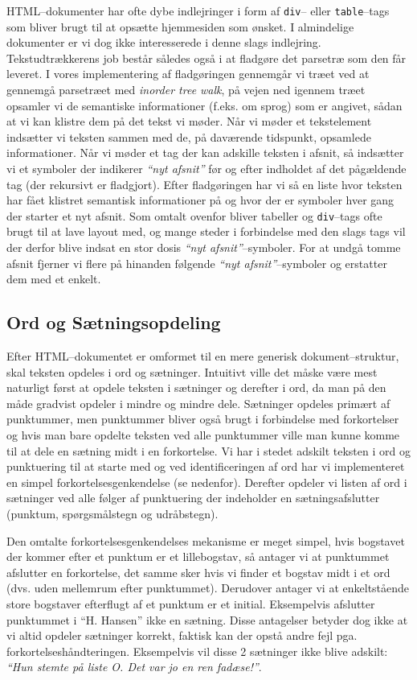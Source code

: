 \documentclass[a4paper,oneside]{memoir}
\begin{document}
HTML--dokumenter har ofte dybe indlejringer i form af \texttt{div}--
eller \texttt{table}--tags som bliver brugt til at opsætte hjemmesiden
som ønsket. I almindelige dokumenter er vi dog ikke interesserede i
denne slags indlejring. Tekstudtrækkerens job består således også i at
fladgøre det parsetræ som den får leveret. I vores implementering af
fladgøringen gennemgår vi træet ved at gennemgå parsetræet med
\textit{inorder tree walk}, på vejen ned igennem træet opsamler vi de
semantiske informationer (f.eks. om sprog) som er angivet, sådan at vi
kan klistre dem på det tekst vi møder. Når vi møder et tekstelement
indsætter vi teksten sammen med de, på daværende tidspunkt, opsamlede
informationer. Når vi møder et tag der kan adskille teksten i afsnit,
så indsætter vi et symboler der indikerer \textit{``nyt afsnit''} før
og efter indholdet af det pågældende tag (der rekursivt er
fladgjort). Efter fladgøringen har vi så en liste hvor teksten har
fået klistret semantisk informationer på og hvor der er symboler hver
gang der starter et nyt afsnit. Som omtalt ovenfor bliver tabeller og
\texttt{div}--tags ofte brugt til at lave layout med, og mange steder
i forbindelse med den slags tags vil der derfor blive indsat en stor
dosis \textit{``nyt afsnit''}--symboler. For at undgå tomme afsnit
fjerner vi flere på hinanden følgende \textit{``nyt
  afsnit''}--symboler og erstatter dem med et enkelt.

\subsection{Ord og Sætningsopdeling}
Efter HTML--dokumentet er omformet til en mere generisk
dokument--struktur, skal teksten opdeles i ord og sætninger. Intuitivt
ville det måske være mest naturligt først at opdele teksten i
sætninger og derefter i ord, da man på den måde gradvist opdeler i
mindre og mindre dele. Sætninger opdeles primært af punktummer, men
punktummer bliver også brugt i forbindelse med forkortelser og hvis
man bare opdelte teksten ved alle punktummer ville man kunne komme til
at dele en sætning midt i en forkortelse. Vi har i stedet adskilt
teksten i ord og punktuering til at starte med og ved identificeringen
af ord har vi implementeret en simpel
forkortelsesgenkendelse (se nedenfor). Derefter opdeler vi listen af ord i
sætninger ved alle følger af punktuering der indeholder en
sætningsafslutter (punktum, spørgsmålstegn og udråbstegn).

Den omtalte forkortelsesgenkendelses mekanisme er meget simpel, hvis
bogstavet der kommer efter et punktum er et lillebogstav, så antager
vi at punktummet afslutter en forkortelse, det samme sker hvis vi
finder et bogstav midt i et ord (dvs. uden mellemrum efter
punktummet). Derudover antager vi at enkeltstående store bogstaver
efterflugt af et punktum er et initial. Eksempelvis afslutter
punktummet i ``H. Hansen'' ikke en sætning. Disse antagelser betyder
dog ikke at vi altid opdeler sætninger korrekt, faktisk kan der opstå
andre fejl pga. forkortelseshåndteringen. Eksempelvis vil disse 2
sætninger ikke blive adskilt: \textit{``Hun stemte på liste O. Det var jo en
ren fadæse!''}.
\end{document}
